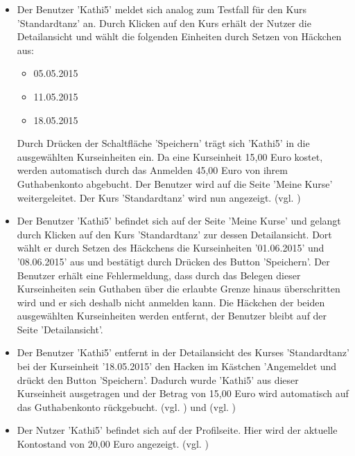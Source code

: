 \documentclass[a4paper]{scrreprt}
\begin{document}
\begin{itemize}
				\item {}
				Der Benutzer 'Kathi5' meldet sich analog zum Testfall  für den Kurs 'Standardtanz' an. Durch Klicken auf den Kurs erhält der Nutzer die Detailansicht und wählt die folgenden Einheiten durch Setzen von Häckchen aus:
					\begin{itemize}
						\item 05.05.2015 
						\item 11.05.2015 
						\item 18.05.2015 
					\end{itemize}	
				Durch Drücken der Schaltfläche 'Speichern' trägt sich 'Kathi5' in die ausgewählten Kurseinheiten ein. Da eine Kurseinheit 15,00 Euro kostet, werden automatisch durch das Anmelden 45,00 Euro von ihrem Guthabenkonto abgebucht. Der Benutzer wird auf die Seite 'Meine Kurse' weitergeleitet. Der Kurs 'Standardtanz' wird nun angezeigt. (vgl. )
		 
				\item {}
				Der Benutzer 'Kathi5' befindet sich auf der Seite 'Meine Kurse' und gelangt durch Klicken auf den Kurs 'Standardtanz' zur dessen Detailansicht. Dort wählt er durch Setzen des Häckchens die Kurseinheiten '01.06.2015' und '08.06.2015' aus und bestätigt durch Drücken des Button 'Speichern'. Der Benutzer erhält eine Fehlermeldung, dass durch das Belegen dieser Kurseinheiten sein Guthaben über die erlaubte Grenze hinaus überschritten wird und er sich deshalb nicht anmelden kann. Die Häckchen der beiden ausgewählten Kurseinheiten werden entfernt, der Benutzer bleibt auf der Seite 'Detailansicht'.
				
				\item {}
				Der Benutzer 'Kathi5' entfernt in der Detailansicht des Kurses 'Standardtanz' bei der Kurseinheit '18.05.2015' den Hacken im Kästchen 'Angemeldet und drückt den Button 'Speichern'. Dadurch wurde 'Kathi5' aus dieser Kurseinheit ausgetragen und der Betrag von 15,00 Euro wird automatisch auf das Guthabenkonto rückgebucht.  (vgl. ) und (vgl. )
				
				\item {}
				Der Nutzer 'Kathi5' befindet sich auf der Profilseite. Hier wird der aktuelle Kontostand von 20,00 Euro angezeigt. (vgl. )
				

\end{itemize}
\end{document}

